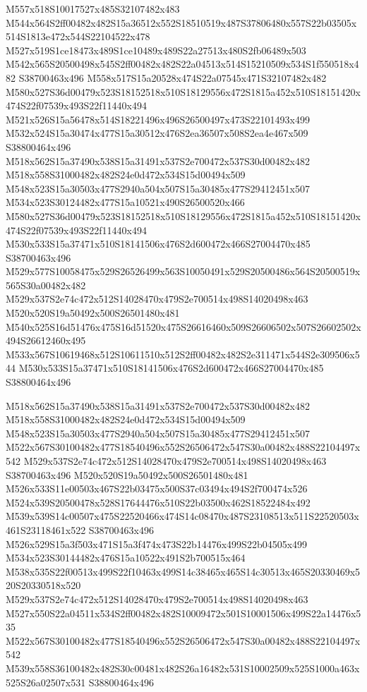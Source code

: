 \documentclass{article}
\begin{document}
\begin{multicols}{2}
M557x518S10017527x485S32107482x483 M544x564S2ff00482x482S15a36512x552S18510519x487S37806480x557S22b03505x514S1813e472x544S22104522x478 M527x519S1ce18473x489S1ce10489x489S22a27513x480S2fb06489x503 M542x565S20500498x545S2ff00482x482S22a04513x514S15210509x534S1f550518x482 S38700463x496 M558x517S15a20528x474S22a07545x471S32107482x482 M580x527S36d00479x523S18152518x510S18129556x472S1815a452x510S18151420x474S22f07539x493S22f11440x494 M521x526S15a56478x514S18221496x496S26500497x473S22101493x499 M532x524S15a30474x477S15a30512x476S2ea36507x508S2ea4e467x509 S38800464x496 M518x562S15a37490x538S15a31491x537S2e700472x537S30d00482x482 M518x558S31000482x482S24e0d472x534S15d00494x509 M548x523S15a30503x477S2940a504x507S15a30485x477S29412451x507 M534x523S30124482x477S15a10521x490S26500520x466 M580x527S36d00479x523S18152518x510S18129556x472S1815a452x510S18151420x474S22f07539x493S22f11440x494 M530x533S15a37471x510S18141506x476S2d600472x466S27004470x485 S38700463x496 M529x577S10058475x529S26526499x563S10050491x529S20500486x564S20500519x565S30a00482x482 M529x537S2e74c472x512S14028470x479S2e700514x498S14020498x463 M520x520S19a50492x500S26501480x481 M540x525S16d51476x475S16d51520x475S26616460x509S26606502x507S26602502x494S26612460x495 M533x567S10619468x512S10611510x512S2ff00482x482S2e311471x544S2e309506x544 M530x533S15a37471x510S18141506x476S2d600472x466S27004470x485 S38800464x496

M518x562S15a37490x538S15a31491x537S2e700472x537S30d00482x482 M518x558S31000482x482S24e0d472x534S15d00494x509 M548x523S15a30503x477S2940a504x507S15a30485x477S29412451x507 M522x567S30100482x477S18540496x552S26506472x547S30a00482x488S22104497x542 M529x537S2e74c472x512S14028470x479S2e700514x498S14020498x463 S38700463x496 M520x520S19a50492x500S26501480x481 M526x533S11e00503x467S22b03475x500S37c03494x494S2f700474x526 M524x539S20500478x528S17644476x510S22b03500x462S18522484x492 M539x539S14c00507x475S22520466x474S14c08470x487S23108513x511S22520503x461S23118461x522 S38700463x496 M526x529S15a3f503x471S15a3f474x473S22b14476x499S22b04505x499 M534x523S30144482x476S15a10522x491S2b700515x464 M538x535S22f00513x499S22f10463x499S14c38465x465S14c30513x465S20330469x520S20330518x520 M529x537S2e74c472x512S14028470x479S2e700514x498S14020498x463 M527x550S22a04511x534S2ff00482x482S10009472x501S10001506x499S22a14476x535 M522x567S30100482x477S18540496x552S26506472x547S30a00482x488S22104497x542 M539x558S36100482x482S30c00481x482S26a16482x531S10002509x525S1000a463x525S26a02507x531 S38800464x496


\end{multicols}
\end{document}
